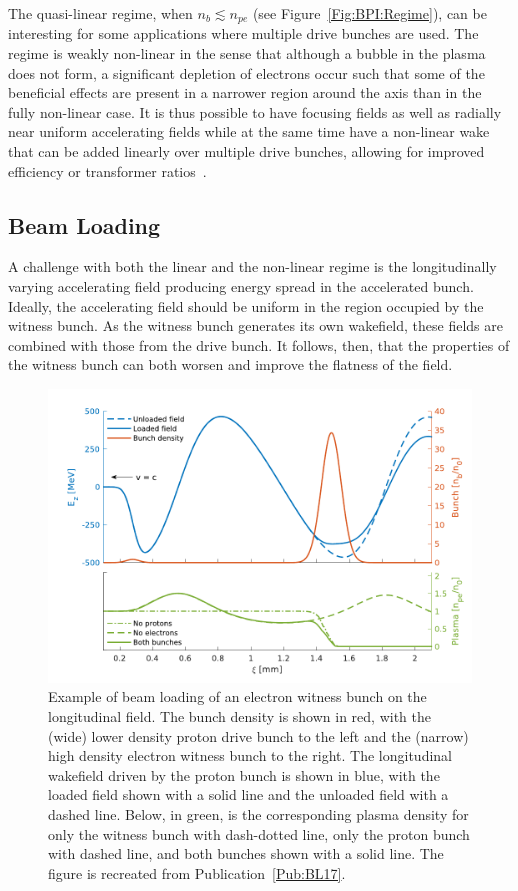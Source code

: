 The quasi-linear regime, when $n_{b} \lesssim n_{pe}$ (see Figure~\ref{Fig:BPI:Regime}), can be interesting for some applications where multiple drive bunches are used.
The regime is weakly non-linear in the sense that although a bubble in the plasma does not form, a significant depletion of electrons occur such that some of the beneficial effects are present in a narrower region around the axis than in the fully non-linear case.
It is thus possible to have focusing fields as well as radially near uniform accelerating fields while at the same time have a non-linear wake that can be added linearly over multiple drive bunches, allowing for improved efficiency or transformer ratios~\cite{muggli:2017,rosenzweig:2010}.

\subsection{Beam Loading}
\label{Int:BPI:BLoad}

A challenge with both the linear and the non-linear regime is the longitudinally varying accelerating field producing energy spread in the accelerated bunch.
Ideally, the accelerating field should be uniform in the region occupied by the witness bunch.
As the witness bunch generates its own wakefield, these fields are combined with those from the drive bunch.
It follows, then, that the properties of the witness bunch can both worsen and improve the flatness of the field.

\begin{figure}[hbt]
    \centering
    \includegraphics[width=0.8125\linewidth,trim={0mm 0mm 0mm 0mm},clip]{figures/BeamLoading}
    \caption{\label{Fig:BPI:BLoad}
        Example of beam loading of an electron witness bunch on the longitudinal field.
        The bunch density is shown in red, with the (wide) lower density proton drive bunch to the left and the (narrow) high density electron witness bunch to the right.
        The longitudinal wakefield driven by the proton bunch is shown in blue, with the loaded field shown with a solid line and the unloaded field with a dashed line.
        Below, in green, is the corresponding plasma density for only the witness bunch with dash-dotted line, only the proton bunch with dashed line, and both bunches shown with a solid line.
        The figure is recreated from Publication~\ref{Pub:BL17}.
    }
\end{figure}

